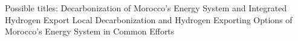 Possible titles:
Decarbonization of Morocco’s Energy System and Integrated Hydrogen Export
Local Decarbonization and Hydrogen Exporting Options of Morocco’s Energy System in Common Efforts